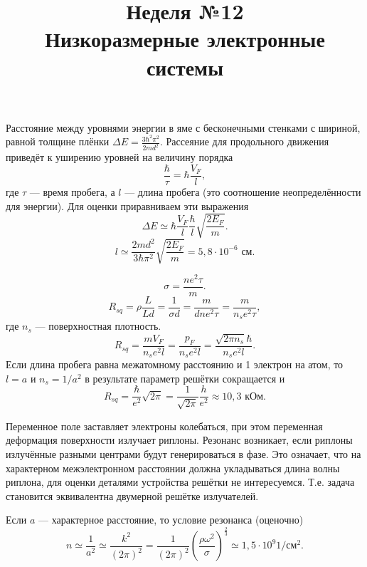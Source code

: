 \documentclass[a4paper]{article}
\title{Неделя №12\\
Низкоразмерные электронные системы}
\begin{document}
	\maketitle
\begin{hiProb}[4.48]
\end{hiProb}
\begin{sol}
Расстояние между уровнями энергии в яме с бесконечными
стенками с шириной, равной
толщине плёнки $\Delta E= \frac{3 \hbar ^2  \pi^2}{2md^2}$. Рассеяние для продольного движения
приведёт к уширению уровней на величину порядка
\[
\frac{\hbar}{\tau} =\hbar  \frac{V_F}{l}
,\] 
где $\tau$ --- время пробега, а $l$ --- длина пробега (это соотношение неопределённости для энергии). Для оценки приравниваем эти выражения
\[
\Delta E \simeq \hbar  \frac{V_F}{l} \frac{\hbar }{l}
\sqrt{\frac{2E_F}{m}} 
.\] 
\[
l \simeq \frac{2m d^2}{3\hbar  \pi^2} \sqrt{\frac{2E_F}{m}} = 5,8 \cdot 10^{-6}\text{ см}
.\] 
\end{sol}
\begin{hiProb}[4.30]
\end{hiProb}
\begin{sol}
\[
\sigma= \frac{ne^2 \tau}{m}
.\] 
\[
R_{sq}= \rho \frac{L}{Ld}=\frac{1}{\sigma d}
= \frac{m}{dne^2 \tau}= \frac{m}{n_s e^2 \tau}
,\]
где $n_s$ --- поверхностная плотность.
\[
	R_{s q}= \frac{m V_F}{n_s e^2 l}=
	\frac{p_F}{n_s e^2 l}=
	\frac{\sqrt{2\pi n_s} \hbar }{n_s e^2 l}
.\] 
Если длина пробега равна межатомному расстоянию
и 1 электрон на атом, то $l=a$ и $n_s= 1 /a^2$ 
в результате параметр решётки сокращается и
\[
R_{s q}= \frac{\hbar }{e^2} \sqrt{ 2\pi} =
\frac{1}{\sqrt{2\pi} }\frac{h}{e^2}\approx
10,3 \text{ кОм}
.\] 
\end{sol}
\begin{hiProb}[Т12-3]
\end{hiProb}
\begin{sol}
Переменное поле заставляет электроны колебаться, при
этом переменная деформация поверхности излучает
риплоны. Резонанс возникает, если  риплоны
излучённые разными центрами будут генерироваться
в фазе. Это означает, что на характерном
межэлектронном расстоянии должна укладываться длина волны
риплона, для оценки деталями устройства решётки
не интересуемся. Т.\:е. задача становится
эквивалентна двумерной решётке
излучателей.

Если $a$ --- характерное расстояние, то условие
резонанса (оценочно)
\[
	n \simeq \frac{1}{a^2}\simeq \frac{k^2}{(2\pi)^2}=\frac{1}{(2\pi)^2}
	\left( \frac{\rho \omega^2}{\sigma} \right) ^{\frac{2}{3}}\simeq 1,5 \cdot 10^{9} 1  /\text{см}^2
.\] 
\end{sol}
\end{document}
